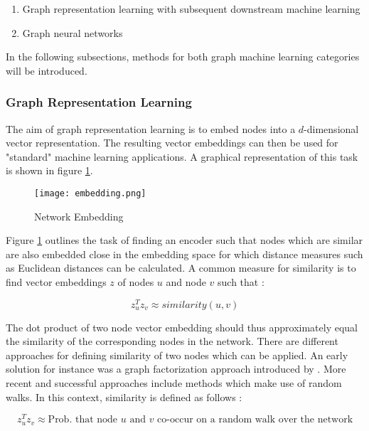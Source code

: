 	\begin{enumerate}
		\item Graph representation learning with subsequent downstream machine
			learning
		\item Graph neural networks
	\end{enumerate}
	
	\noindent In the following subsections, methods for both graph machine learning
	categories will be introduced.

	\subsubsection{Graph Representation Learning}

	The aim of graph representation learning is to embed nodes into a
	$d$-dimensional vector representation. The resulting vector embeddings can
	then be used for "standard" machine learning applications. A graphical
	representation of this task is shown in figure \ref{fig:embedding}.

	\begin{figure}[h]
		\centering
		\texttt{[image: embedding.png]}
		\caption{Network Embedding}
		\cite{leskovec2021lecture}
		\label{fig:embedding}
	\end{figure}

	\noindent Figure \ref{fig:embedding} outlines the task of finding an
	encoder such that nodes which are similar are also embedded close in the
	embedding space for which distance measures such as Euclidean distances can
	be calculated. A common measure for similarity is to find vector embeddings 
	$z$ of nodes $u$ and node $v$ such that \citep{leskovec2021lecture}:

	\begin{equation}
		z_u^Tz_v \approx similarity(u,v)
	\end{equation}

	\noindent The dot product of two node vector embedding should thus
	approximately equal the similarity of the corresponding nodes in the
	network. There are different approaches for defining similarity of two
	nodes which can be applied. An early solution for instance was a graph
	factorization approach introduced by \cite{ahmed2013distributed}. More
	recent and successful approaches include methods which make use of random
	walks. In this context, similarity is defined as follows
	\citep{leskovec2021lecture}:

	\begin{equation}
		z_u^Tz_v \approx \text{Prob. that node $u$ and $v$ co-occur on a random walk over the network}
	\end{equation}

